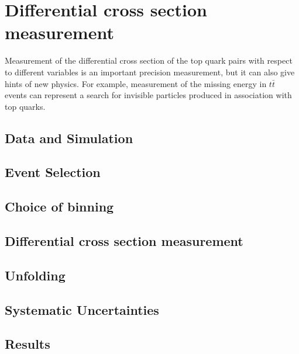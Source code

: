 \chapter[Differential cross section measurement]{Differential cross section \\
measurement}
\ifpdf
    \graphicspath{{06_Cross_section_analysis/plots/}}
\else
    \graphicspath{{06_Cross_section_analysis/plots/EPS/}{06_Cross_section_analysis/plots/}}
\fi

Measurement of the differential cross section of the top quark pairs with respect to different variables is an important precision measurement, but it can also give hints of new physics. For example, measurement of the missing energy in $t\bar{t}$ events can represent a search for invisible particles produced in association with top quarks.

\section{Data and Simulation}

\section{Event Selection}

\section{Choice of binning}

\section{Differential cross section measurement}

\section{Unfolding}

\section{Systematic Uncertainties}

\section{Results}

